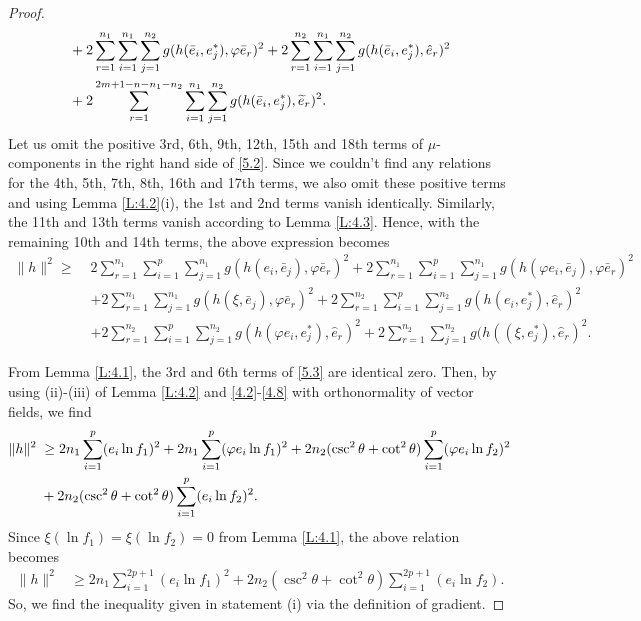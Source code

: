 \documentclass[reqno]{amsart}
\theoremstyle{plain}
\theoremstyle{remark}
\numberwithin{equation}{section}
\def\e{\eqref}
\def\e{\eqref}
\begin{document}
\begin{proof}
\begin{align}
&+2\sum_{r=1}^{n_1}\sum_{i=1}^{n_1}\sum_{j=1}^{n_2}g(h(\bar e_i,  e_j^{*}), \varphi \bar e_r)^2+2\sum_{r=1}^{n_2}\sum_{i=1}^{n_1}\sum_{j=1}^{n_2}g(h(\bar e_i,  e_j^{*}), \hat e_r)^2
\notag\\
&+2\sum_{r=1}^{2m+1-n-n_1-n_2}\sum_{i=1}^{n_1}\sum_{j=1}^{n_2}g(h(\bar e_i,  e_j^{*}), \widetilde e_r)^2.\notag
\end{align}
Let us omit the  positive 3rd, 6th, 9th, 12th, 15th and 18th terms of $\mu$-components in the right hand side of \eqref{5.2}. Since we couldn't find any relations for the 4th, 5th, 7th, 8th, 16th and 17th terms, we also omit these positive terms and using Lemma \ref{L:4.2}(i), the 1st and 2nd terms vanish identically. Similarly, the 11th and 13th terms vanish according to Lemma \ref{L:4.3}. Hence, with the remaining 10th and 14th terms, the above expression becomes
\begin{equation}\begin{aligned}\label{5.3}
\|h\|^2\geq\; & 2\sum_{r=1}^{n_1}\sum_{i=1}^{p}\sum_{j=1}^{n_1}g(h(e_i, \bar e_j), \varphi \bar e_r)^2+2\sum_{r=1}^{n_1}\sum_{i=1}^{p}\sum_{j=1}^{n_1}g(h(\varphi e_i, \bar e_j), \varphi \bar e_r)^2\\ 
&+2\sum_{r=1}^{n_1}\sum_{j=1}^{n_1}g(h(\mathfrak{\xi}, \bar e_j), \varphi \bar e_r)^2+2\sum_{r=1}^{n_2}\sum_{i=1}^{p}\sum_{j=1}^{n_2}g(h(e_i, e_j^{*}), \hat e_r)^2
\\& +2\sum_{r=1}^{n_2}\sum_{i=1}^{p}\sum_{j=1}^{n_2}g(h(\varphi e_i, e_j^{*}), \hat e_r)^2+2\sum_{r=1}^{n_2}\sum_{j=1}^{n_2}g(h((\mathfrak{\xi}, e_j^{*}), \hat e_r)^2.
\end{aligned}\end{equation}

From Lemma \ref{L:4.1}, the 3rd and 6th terms of \e{5.3} are identical zero. Then, by using (ii)-(iii) of Lemma \ref{L:4.2} and  \eqref{4.2}-\eqref{4.8} with orthonormality of vector fields, we find
\begin{align}\label{5.4}
\|h\|^2\; & \geq2n_1\sum_{i=1}^{p}(e_i\ln f_1)^2+2n_1\sum_{i=1}^{p}(\varphi e_i\ln f_1)^2+2n_2(\csc^2\theta+\cot^2\theta)\sum_{i=1}^{p}(\varphi e_i\ln f_2)^2\notag\\
&+2n_2(\csc^2\theta+\cot^2\theta)\sum_{i=1}^{p}(e_i\ln f_2)^2.
\end{align}
Since  $\mathfrak{\xi}(\ln f_1)=\mathfrak{\xi}(\ln f_2)=0$ from Lemma \ref{L:4.1}, the above relation becomes
\begin{equation}\begin{aligned}\label{5.5}
\|h\|^2&\geq2n_1\sum_{i=1}^{2p+1}(e_i\ln f_1)^2+2n_2(\csc^2\theta+\cot^2\theta)\sum_{i=1}^{2p+1}(e_i\ln f_2).
\end{aligned}\end{equation}
So,  we find the inequality given in statement (i) via the definition of gradient. 


\end{proof}
\end{document}
